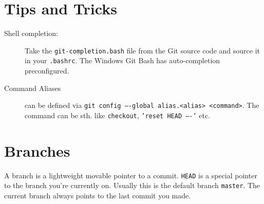 \documentclass[a4paper,notumble]{leaflet} %
\begin{document}
\section{Tips and Tricks}
\begin{description}
\item[Shell completion:] Take the \texttt{git-com\-ple\-tion.bash} file from the Git source code and source it in your \verb!.bashrc!. The Windows Git Bash has auto-completion preconfigured.
\item[Command Aliases] can be defined via \texttt{git config ----global alias.<alias> <command>}. The command can be sth. like \texttt{checkout}, \texttt{'reset HEAD ----'} etc.
\end{description}

\section{Branches}
A branch is a lightweight movable pointer to a commit. \texttt{HEAD} is a special pointer to the branch you're currently on. Usually this is the default branch \texttt{master}. The current branch always points to the last commit you made.
\end{document}

